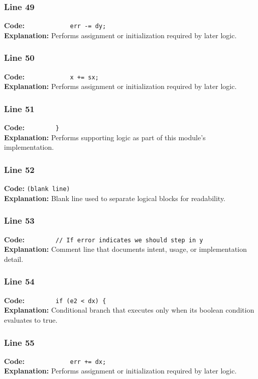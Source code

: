 \documentclass[11pt,a4paper]{article}
\begin{document}
\subsubsection*{Line 49}
\textbf{Code:} \verb|            err -= dy;|\\
\textbf{Explanation:} Performs assignment or initialization required by later logic.

\subsubsection*{Line 50}
\textbf{Code:} \verb|            x += sx;|\\
\textbf{Explanation:} Performs assignment or initialization required by later logic.

\subsubsection*{Line 51}
\textbf{Code:} \verb|        }|\\
\textbf{Explanation:} Performs supporting logic as part of this module's implementation.

\subsubsection*{Line 52}
\textbf{Code:} \texttt{(blank line)}\\
\textbf{Explanation:} Blank line used to separate logical blocks for readability.

\subsubsection*{Line 53}
\textbf{Code:} \verb|        // If error indicates we should step in y|\\
\textbf{Explanation:} Comment line that documents intent, usage, or implementation detail.

\subsubsection*{Line 54}
\textbf{Code:} \verb|        if (e2 < dx) {|\\
\textbf{Explanation:} Conditional branch that executes only when its boolean condition evaluates to true.

\subsubsection*{Line 55}
\textbf{Code:} \verb|            err += dx;|\\
\textbf{Explanation:} Performs assignment or initialization required by later logic.
\end{document}
